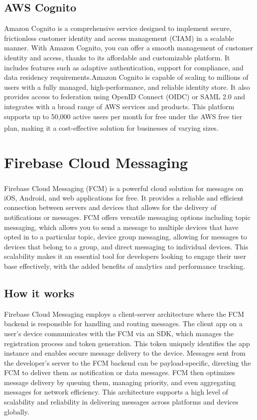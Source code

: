 \subsection{AWS Cognito}
Amazon Cognito is a comprehensive service designed to implement secure, frictionless customer
identity and access management (CIAM) in a scalable manner. With Amazon Cognito, you can offer a
smooth management of customer identity and access, thanks to its affordable and customizable
platform. It includes features such as adaptive authentication, support for compliance, and data
residency requirements.Amazon Cognito is capable of scaling to millions of users with a fully
managed, high-performance, and reliable identity store. It also provides access to federation using
OpenID Connect (OIDC) or SAML 2.0 and integrates with a broad range of AWS services and products.
This platform supports up to 50,000 active users per month for free under the AWS free tier plan,
making it a cost-effective solution for businesses of varying sizes\textsuperscript{\cite{tech_7}}.

\section{Firebase Cloud Messaging}
Firebase Cloud Messaging (FCM)\textsuperscript{\cite{tech_9}} is a powerful cloud solution for
messages on iOS, Android, and web applications for free. It provides a reliable and efficient
connection between servers and devices that allows for the delivery of notifications or messages.
FCM offers versatile messaging options including topic messaging, which allows you to send a message
to multiple devices that have opted in to a particular topic, device group messaging, allowing for
messages to devices that belong to a group, and direct messaging to individual devices. This
scalability makes it an essential tool for developers looking to engage their user base effectively,
with the added benefits of analytics and performance tracking.

\subsection{How it works}
Firebase Cloud Messaging employs a client-server architecture where the FCM backend is responsible
for handling and routing messages. The client app on a user's device communicates with the FCM via
an SDK, which manages the registration process and token generation. This token uniquely identifies
the app instance and enables secure message delivery to the device. Messages sent from the
developer's server to the FCM backend can be payload-specific, directing the FCM to deliver them as
notification or data messages. FCM then optimizes message delivery by queuing them, managing
priority, and even aggregating messages for network efficiency. This architecture supports a high
level of scalability and reliability in delivering messages across platforms and devices globally.

